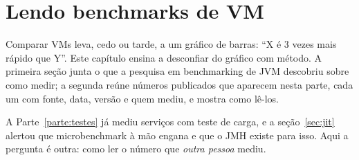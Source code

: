 \chapter{Lendo benchmarks de VM}
\label{cap:benchmarks}

\proximasaulas

Comparar VMs leva, cedo ou tarde, a um gráfico de barras: \enquote{X é
3 vezes mais rápido que Y}. Este capítulo ensina a desconfiar do gráfico
com método. A primeira seção junta o que a pesquisa em benchmarking de
JVM descobriu sobre como medir; a segunda reúne números publicados que
aparecem nesta parte, cada um com fonte, data, versão e quem mediu, e
mostra como lê-los.

A Parte~\ref{parte:testes} já mediu serviços com teste de carga, e a seção~\ref{sec:jit}
alertou que microbenchmark à mão engana e que o JMH existe para isso.
Aqui a pergunta é outra: como ler o número que \emph{outra pessoa}
mediu.






